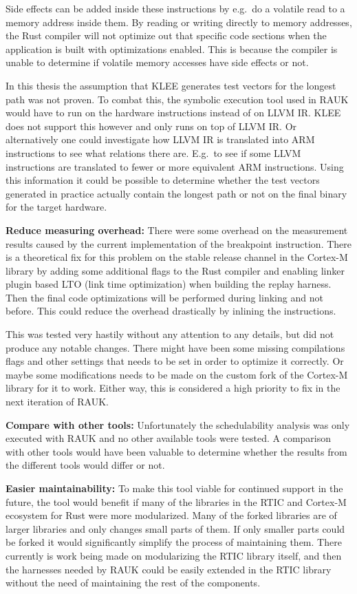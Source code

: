 Side effects can be added inside these instructions by e.g.\ do a volatile
read to a memory address inside them. By reading or writing directly to memory
addresses, the Rust compiler will not optimize out that specific code sections
when the application is built with optimizations enabled. This is because the
compiler is unable to determine if volatile memory accesses have side effects
or not.

In this thesis the assumption that KLEE generates test vectors for the longest
path was not proven. To combat this, the symbolic execution tool used in RAUK
would have to run on the hardware instructions instead of on LLVM IR\@. KLEE does
not support this however and only runs on top of LLVM IR\@. Or alternatively one
could investigate how LLVM IR is translated into ARM instructions to see what
relations there are. E.g.\ to see if some LLVM instructions are translated to
fewer or more equivalent ARM instructions. Using this information it could
be possible to determine whether the test vectors generated in practice
actually contain the longest path or not on the final binary for the target
hardware.

\textbf{Reduce measuring overhead:} There were some overhead on the measurement
results caused by the current implementation of the breakpoint instruction.
There is a theoretical fix for this problem on the stable release channel in
the Cortex-M library by adding some additional flags to the Rust compiler and
enabling linker plugin based LTO (link time optimization) when building the
replay harness. Then the final code optimizations will be performed during
linking and not before. This could reduce the overhead drastically by inlining
the instructions. 

This was tested very hastily without any attention to any details, but did not
produce any notable changes. There might have been some missing compilations
flags and other settings that needs to be set in order to optimize it
correctly. Or maybe some modifications needs to be made on the custom fork of
the Cortex-M library for it to work. Either way, this is considered a high
priority to fix in the next iteration of RAUK\@.

\textbf{Compare with other tools:} Unfortunately the schedulability analysis
was only executed with RAUK and no other available tools were tested. A
comparison with other tools would have been valuable to determine whether the
results from the different tools would differ or not. 

\textbf{Easier maintainability:} To make this tool viable for continued support
in the future, the tool would benefit if many of the libraries in the RTIC and
Cortex-M ecosystem for Rust were more modularized. Many of the forked libraries
are of larger libraries and only changes small parts of them. If only smaller
parts could be forked it would significantly simplify the process of
maintaining them. There currently is work being made on modularizing the RTIC
library itself, and then the harnesses needed by RAUK could be easily extended
in the RTIC library without the need of maintaining the rest of the components.

